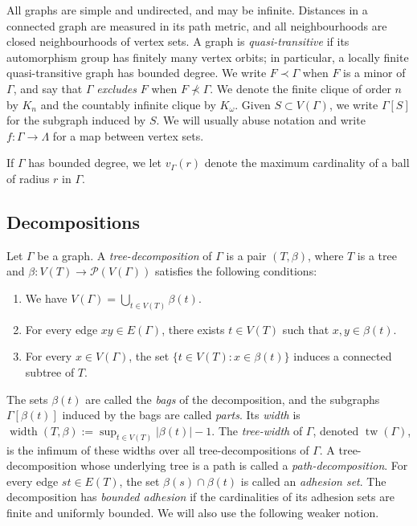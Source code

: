 \documentclass[a4paper]{amsart}
\begin{document}
All graphs are simple and undirected, and may be infinite.
Distances in a connected graph are measured in its path metric, and all neighbourhoods are closed neighbourhoods of vertex sets.
A graph is \emph{quasi-transitive} if its automorphism group has finitely many vertex orbits; in particular, a locally finite quasi-transitive graph has bounded degree.
We write $F\prec\Gamma$ when $F$ is a minor of $\Gamma$, and say that $\Gamma$ \emph{excludes} $F$ when $F\nprec\Gamma$.
We denote the finite clique of order $n$ by $K_n$ and the countably infinite clique by $K_\omega$. Given $S \subset V(\Gamma)$, we write $\Gamma[S]$ for the subgraph induced by $S$. We will usually abuse notation and write $f:\Gamma\to\Lambda$ for a map between vertex sets.

If $\Gamma$ has bounded degree, we let $v_\Gamma(r)$ denote the maximum cardinality of a ball of radius $r$ in $\Gamma$.

\subsection{Decompositions}\label{subsec:decompositions}


Let $\Gamma$ be a graph.
A \emph{tree-decomposition} of $\Gamma$ is a pair $(T,\beta)$, where $T$ is a tree and $\beta:V(T)\to\mathcal{P}(V(\Gamma))$ satisfies the following conditions:
\begin{enumerate}
\item[(T1)] We have $V(\Gamma)=\bigcup_{t\in V(T)}\beta(t)$.
\item[(T2)] For every edge $xy\in E(\Gamma)$, there exists $t\in V(T)$ such that $x,y\in\beta(t)$.
\item[(T3)] For every $x\in V(\Gamma)$, the set $\{t\in V(T):x\in\beta(t)\}$ induces a connected subtree of $T$.
\end{enumerate}
The sets $\beta(t)$ are called the \emph{bags} of the decomposition, and the subgraphs $\Gamma[\beta(t)]$ induced by the bags are called \emph{parts}.
Its \emph{width} is $\operatorname{width}(T,\beta):=\sup_{t\in V(T)}|\beta(t)|-1$.
The \emph{tree-width} of $\Gamma$, denoted $\operatorname{tw}(\Gamma)$, is the infimum of these widths over all tree-decompositions of $\Gamma$.
A tree-decomposition whose underlying tree is a path is called a \emph{path-decomposition}.
For every edge $st\in E(T)$, the set $\beta(s)\cap\beta(t)$ is called an \emph{adhesion set}.
The decomposition has \emph{bounded adhesion} if the cardinalities of its adhesion sets are finite and uniformly bounded.
We will also use the following weaker notion.
\end{document}
